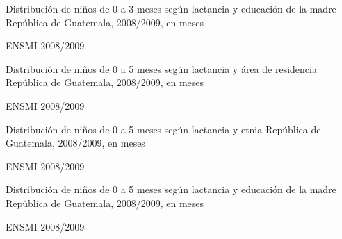 
%
{%
}%
{%
	Distribución de niños de 0 a 3 meses según lactancia y educación de la madre
} %
{%
	República de Guatemala, 2008/2009, en meses} %
{%
	\begin{tikzpicture}[x=1pt,y=1pt]    \end{tikzpicture}
}%
{%
	ENSMI 2008/2009} %


%
{%
}%
{%
	Distribución de niños de 0 a 5 meses según lactancia y área de residencia
} %
{%
	República de Guatemala, 2008/2009, en meses} %
{%
	\begin{tikzpicture}[x=1pt,y=1pt]    \end{tikzpicture}
}%
{%
	ENSMI 2008/2009} %



%
{%
}%
{%
	Distribución de niños de 0 a 5 meses según lactancia y etnia
} %
{%
	República de Guatemala, 2008/2009, en meses} %
{%
	\begin{tikzpicture}[x=1pt,y=1pt]    \end{tikzpicture}
}%
{%
	ENSMI 2008/2009} %



%
{%
}%
{%
	Distribución de niños de 0 a 5 meses según lactancia y educación de la madre
} %
{%
	República de Guatemala, 2008/2009, en meses} %
{%
	\begin{tikzpicture}[x=1pt,y=1pt]    \end{tikzpicture}
}%
{%
	ENSMI 2008/2009} %